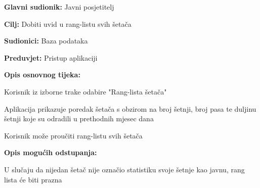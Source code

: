 		\newpage
			
				
			\noindent {}
			\begin{packed_item}
				
				\item \textbf{Glavni sudionik:} Javni posjetitelj
				\item  \textbf{Cilj:} Dobiti uvid u rang-listu svih šetača
				\item  \textbf{Sudionici:} Baza podataka
				\item  \textbf{Preduvjet:} Pristup aplikaciji
				\item  \textbf{Opis osnovnog tijeka:}
				
				\item[] \begin{packed_enum}
					
					\item Korisnik iz izborne trake odabire "Rang-lista šetača"
					\item Aplikacija prikazuje poredak šetača s obzirom na broj šetnji, broj pasa te duljinu šetnji koje su odradili u prethodnih mjesec dana
					\item Korisnik može proučiti rang-listu svih šetača
				\end{packed_enum}
				\item  \textbf{Opis mogućih odstupanja:}
				\item[] \begin{packed_item}
					\item [2.a] U slučaju da nijedan šetač nije označio statistiku svoje šetnje kao javnu, rang lista će biti prazna
				\end{packed_item}
			\end{packed_item}
	
	
	

